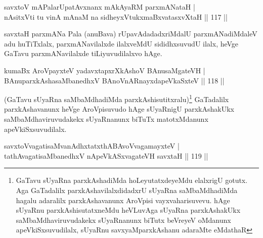 
\begin{shl}
savxtoV mAPalarUpatAvxnanx mAkAyaRM parxmANataH |\\
nAsitxVti tu vinA mAnaM na sidheyxVtukxmaBxvatasxvXtaH \hfill || 117 ||
\end{shl}

\begin{artha}%
savxtaH parxmANa Pala (anuBava) rUpavAdadadxriMdalU parxmANadiMdaleV adu huTiTxlalx, parxmANavilalxde ilalxveMdU sididhxsuvudU ilalx, heVge GaTavu parxmANavilalxde tiLiyuvudilalxvo hAge.
\end{artha}


\begin{shl}
kumaBx AroVpayxteV yadavxtapxrXkAshoV BAnusaMgateVH |\\
BAnuparxkAshasaMbanedhxV BAnoVnARnayxdapeVkaSxteV \hfill || 118 ||
\end{shl}

\begin{artha}
(GaTavu sUyaRna saMbaMdhadiMda parxkAshisutitxralu)\footnote[1]{GaTavu sUyaRna parxkAshadiMda hoLeyutatxdeyeMdu elalxrigU gotutx. Aga GaTadalilx parxkAshavilalxdidadxrU sUyaRna saMbaMdhadiMda hagalu adaralilx parxkAshavanunx AroVpisi vayxvaharisu\-vevu. hAge sUyaRnu parxkAshisutatxneMdu heVLuvAga sUyaRna parxkAshakUkx saMbaMdhaviruvudakekx sUyaRnanunx biTutx beVreyeV oMdanunx apeVkiSxsuvudilalx, sUyaRnu savxyaMparxkAshanu adaraMte eMdathaR} GaTadalilx parxkAshavanunx heVge AroVpisuvudo hAge sUyaRnigU parxkAshakUkx saMbaMdhaviruvudakekx sUyaRnanunx biTuTx matotxMdanunx apeVkiSxsuvudilalx.
\end{artha}

\begin{shl}
\footnotemark[2]savxtoV\s vagatisaMvanAdhxtatxthA\s BAvoV\s vagamayxteV |\\
tathA\s vagatisaMbanedhxV nApeVkASx\s vagateVH savxtaH \hfill || 119 ||
\end{shl}

